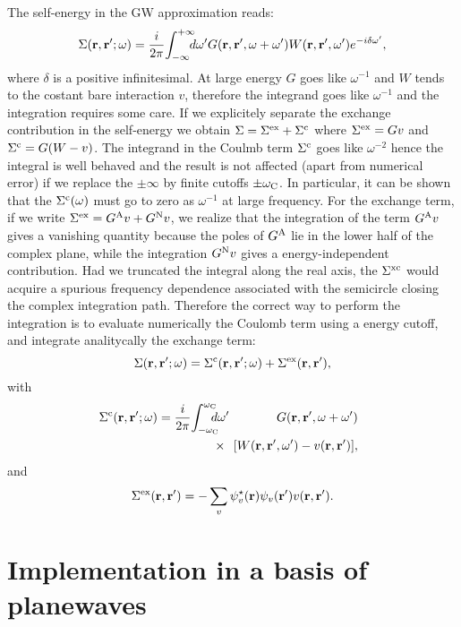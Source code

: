 \documentclass[twocolumn,prb,showpacs,superscriptaddress]{revtex4}
\def\w{\omega}
\def\wp{\omega^\prime}
\def\wc{{\omega_{\rm C}}}
\def\r{{\bf r}}
\def\rp{{\bf r^\prime}}
\begin{document}
The self-energy in the GW approximation reads:\cite{hl86}
  \begin{equation} \label{eq.sigma}
  \Sigma(\r,\rp;\w) = \frac{i}{2\pi} \! \int_{-\infty}^{+\infty} \!\!\!\!d\wp 
    G(\r,\rp,\w+\wp) W(\r,\rp,\wp) e^{-i\delta\wp},
  \end{equation}
where $\delta$ is a positive infinitesimal. 
At large energy $G$ goes like $\w^{-1}$ and $W$ tends to the costant 
bare interaction $v$, therefore the integrand goes like $\w^{-1}$
and the integration requires some care.
If we explicitely separate the exchange contribution in the self-energy we obtain
$\Sigma = \Sigma^{\rm ex} + \Sigma^{\rm c}$ where $\Sigma^{\rm ex}=Gv$
and $\Sigma^{\rm c}=G(W-v)$.\cite{pade3}
The integrand in the Coulmb term $\Sigma^{\rm c}$ goes like $\w^{-2}$ 
hence the integral is well behaved and the result is not affected
(apart from numerical error) if we replace the $\pm \infty$ by finite cutoffs $\pm \wc$.
In particular, it can be shown that the $\Sigma^{\rm c}(\w)$ must go to zero
as $\w^{-1}$ at large frequency.
For the exchange term, if we write $\Sigma^{\rm ex}=G^{\rm A}v + G^{\rm N}v$,
we realize that the integration of the term $G^{\rm A}v$ gives a
vanishing quantity because the poles of $G^{\rm A}$ lie in the lower half 
of the complex plane, while the integration $G^{\rm N}v$ gives a energy-independent contribution.
Had we truncated the integral along the real axis, the $\Sigma^{\rm xc}$
would acquire a spurious frequency dependence associated with
the semicircle closing the complex integration path.
Therefore the correct way to perform the integration is to evaluate numerically
the Coulomb term using a energy cutoff, and integrate analitycally the exchange term:
  \begin{equation}
  \Sigma(\r,\rp;\w) = \Sigma^{\rm c}(\r,\rp;\w) + \Sigma^{\rm ex}(\r,\rp),
  \end{equation}
with
  \begin{eqnarray}
  \!\!\!\! \Sigma^{\rm c}(\r,\rp;\w) = \frac{i}{2\pi} \! \int_{-\wc}^\wc \!\!& \!\!d\wp &
    \!\!\! G(\r,\rp,\w+\wp) \nonumber \\ 
  & \times \!\!& \!\!\!\! [W(\r,\rp,\wp)-v(\r,\rp)],
  \end{eqnarray}
and
  \begin{equation}
  \Sigma^{\rm ex}(\r,\rp) = - \sum_v \psi_v^\star(\r)\psi_v(\rp) v(\r,\rp).
  \end{equation}


\section{Implementation in a basis of planewaves}\label{sec.theory.g}
\end{document}
